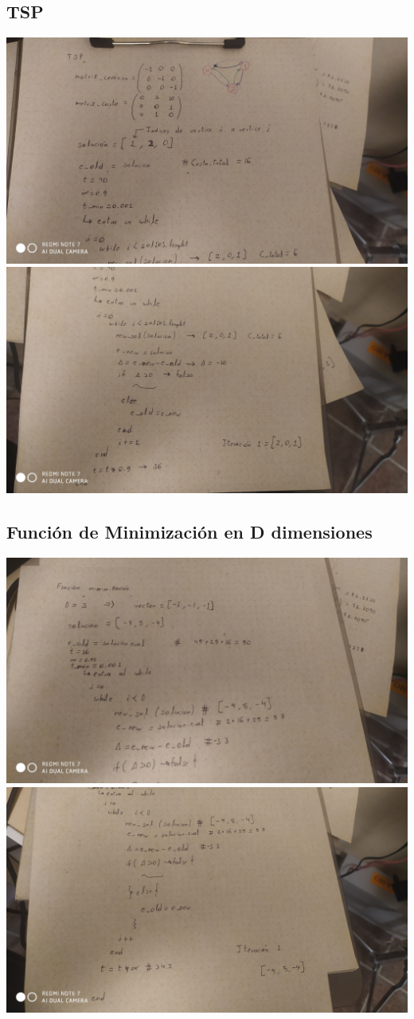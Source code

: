 \documentclass[10pt]{article}
\begin{document}
\subsection{TSP}
\includegraphics[scale=0.135]{imgs/tsp-1.jpg}\\
\includegraphics[scale=0.135]{imgs/tsp-2.jpg}
\subsection{Función de Minimización en D dimensiones}
\includegraphics[scale=0.135]{imgs/min-1.jpg}\\
\includegraphics[scale=0.135]{imgs/min-2.jpg}
\end{document}
